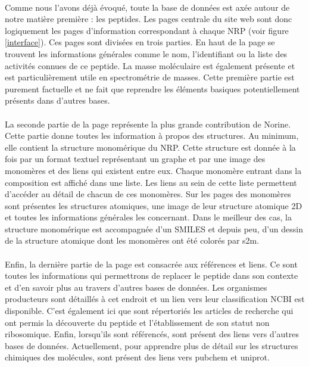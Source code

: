 \documentclass[12pt,french,twoside]{report}
\begin{document}
\paragraph{}Comme nous l'avons déjà évoqué, toute la base de données est axée autour de notre matière première : les peptides.
Les pages centrale du site web sont donc logiquement les pages d'information correspondant à chaque NRP (voir figure \ref{interface}).
Ces pages sont divisées en trois parties.
En haut de la page se trouvent les informations générales comme le nom, l'identifiant ou la liste des activités connues de ce peptide.
La masse moléculaire est également présente et est particulièrement utile en spectrométrie de masses.
Cette première partie est purement factuelle et ne fait que reprendre les éléments basiques potentiellement présents dans d'autres bases.

\paragraph{}La seconde partie de la page représente la plus grande contribution de Norine.
Cette partie donne toutes les information à propos des structures.
Au minimum, elle contient la structure monomérique du NRP.
Cette structure est donnée à la fois par un format textuel représentant un graphe et par une image des monomères et des liens qui existent entre eux.
Chaque monomère entrant dans la composition est affiché dans une liste.
Les liens au sein de cette liste permettent d'accéder au détail de chacun de ces monomères.
Sur les pages des monomères sont présentes les structures atomiques, une image de leur structure atomique 2D et toutes les informations générales les concernant.
Dans le meilleur des cas, la structure monomérique est accompagnée d'un SMILES et depuis peu, d'un dessin de la structure atomique dont les monomères ont été colorés par s2m.

\paragraph{}Enfin, la dernière partie de la page est consacrée aux références et liens.
Ce sont toutes les informations qui permettrons de replacer le peptide dans son contexte et d'en savoir plus au travers d'autres bases de données.
Les organismes producteurs sont détaillés à cet endroit et un lien vers leur classification NCBI est disponible.
C'est également ici que sont répertoriés les articles de recherche qui ont permis la découverte du peptide et l'établissement de son statut non ribosomique.
Enfin, lorsqu'ils sont référencés, sont présent des liens vers d'autres bases de données.
Actuellement, pour apprendre plus de détail sur les structures chimiques des molécules, sont présent des liens vers pubchem et uniprot.
\end{document}
